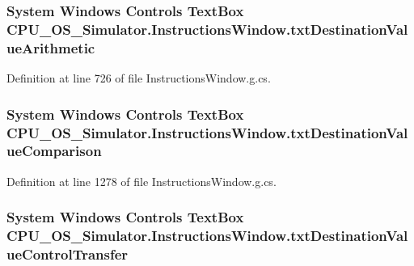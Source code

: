\subsubsection[{txt\+Destination\+Value\+Arithmetic}]{\setlength{\rightskip}{0pt plus 5cm}System Windows Controls Text\+Box C\+P\+U\+\_\+\+O\+S\+\_\+\+Simulator.\+Instructions\+Window.\+txt\+Destination\+Value\+Arithmetic\hspace{0.3cm}{\ttfamily [package]}}\label{class_c_p_u___o_s___simulator_1_1_instructions_window_adac073cb591b15be22d041695ff498e4}


Definition at line 726 of file Instructions\+Window.\+g.\+cs.

\hypertarget{class_c_p_u___o_s___simulator_1_1_instructions_window_ab44686bd174144a0c1042579d6665547}{}
\subsubsection[{txt\+Destination\+Value\+Comparison}]{\setlength{\rightskip}{0pt plus 5cm}System Windows Controls Text\+Box C\+P\+U\+\_\+\+O\+S\+\_\+\+Simulator.\+Instructions\+Window.\+txt\+Destination\+Value\+Comparison\hspace{0.3cm}{\ttfamily [package]}}\label{class_c_p_u___o_s___simulator_1_1_instructions_window_ab44686bd174144a0c1042579d6665547}


Definition at line 1278 of file Instructions\+Window.\+g.\+cs.

\hypertarget{class_c_p_u___o_s___simulator_1_1_instructions_window_a0049dce789d892e6620158859bcf7057}{}
\subsubsection[{txt\+Destination\+Value\+Control\+Transfer}]{\setlength{\rightskip}{0pt plus 5cm}System Windows Controls Text\+Box C\+P\+U\+\_\+\+O\+S\+\_\+\+Simulator.\+Instructions\+Window.\+txt\+Destination\+Value\+Control\+Transfer\hspace{0.3cm}{\ttfamily [package]}}\label{class_c_p_u___o_s___simulator_1_1_instructions_window_a0049dce789d892e6620158859bcf7057}


